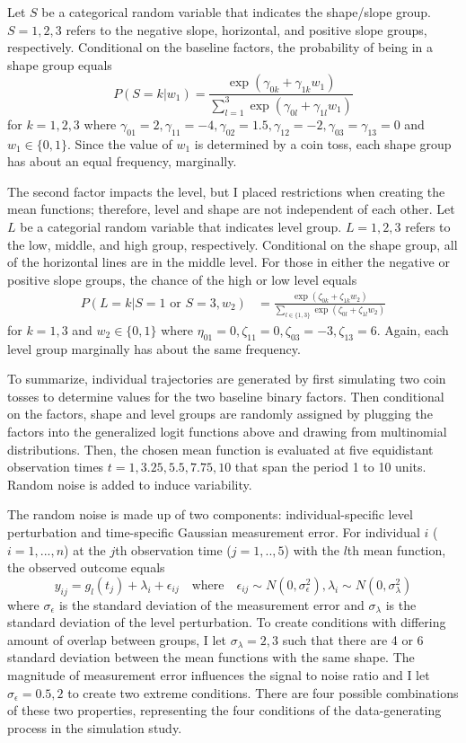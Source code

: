 \documentclass[12pt]{article}
\begin{document}
Let $S$ be a categorical random variable that indicates the shape/slope group. $S=1,2,3$ refers to the negative slope, horizontal, and positive slope groups, respectively. Conditional on the baseline factors, the probability of being in a shape group equals
$$P(S=k |w_{1}) = \frac{\exp(\gamma_{0k}+\gamma_{1k}w_{1})}{\sum^{3}_{l=1} \exp(\gamma_{0l}+\gamma_{1l}w_{1})}$$
for $k=1,2,3$ where $\gamma_{01}=2,\gamma_{11} = -4,\gamma_{02}=1.5,\gamma_{12}=-2,\gamma_{03}=\gamma_{13} = 0$ and $w_{1}\in\{0,1\}$. Since the value of $w_{1}$ is determined by a coin toss, each shape group has about an equal frequency, marginally. 

The second factor impacts the level, but I placed restrictions when creating the mean functions; therefore, level and shape are not independent of each other. Let $L$ be a categorial random variable that indicates level group. $L=1,2,3$ refers to the low, middle, and high group, respectively. Conditional on the shape group, all of the horizontal lines are in the middle level. For those in either the negative or positive slope groups, the chance of the high or low level equals
\begin{align*}
P(L=k|S=1 \text{ or } S=3,w_{2}) & = \frac{\exp(\zeta_{0k}+\zeta_{1k} w_{2})}{\sum_{l\in\{1,3\} }\exp(\zeta_{0l}+\zeta_{1l}w_{2})}
\end{align*}
for $k=1,3$ and $w_{2}\in\{0,1\}$ where $\eta_{01}=0,\zeta_{11}=0,\zeta_{03}=-3,\zeta_{13}=6$. Again, each level group marginally has about the same frequency.

To summarize, individual trajectories are generated by first simulating two coin tosses to determine values for the two baseline binary factors. Then conditional on the factors, shape and level groups are randomly assigned by plugging the factors into the generalized logit functions above and drawing from multinomial distributions. Then, the chosen mean function is evaluated at five equidistant observation times $t=1,3.25,5.5,7.75,10$ that span the period 1 to 10 units. Random noise is added to induce variability. 

The random noise is made up of two components: individual-specific level perturbation and time-specific Gaussian measurement error. For individual $i$ ($i=1,...,n$) at the $j$th observation time ($j=1,..,5$) with the $l$th mean function, the observed outcome equals
$$y_{ij} = g_{l}(t_{j})+\lambda_{i}+\epsilon_{ij}\quad\text{where}\quad \epsilon_{ij}\sim N(0,\sigma_{\epsilon}^{2}), \lambda_{i}\sim N(0,\sigma_{\lambda}^{2})$$
where $\sigma_{\epsilon}$  is the standard deviation of the measurement error and $\sigma_{\lambda}$ is the standard deviation of the level perturbation. To create conditions with differing amount of overlap between groups, I let $\sigma_{\lambda}=2,3$ such that there are 4 or 6 standard deviation between the mean functions with the same shape. The magnitude of measurement error influences the signal to noise ratio and I let $\sigma_{\epsilon}=0.5, 2$ to create two extreme conditions. There are four possible combinations of these two properties, representing the four  conditions of the data-generating process in the simulation study. 
\end{document}
